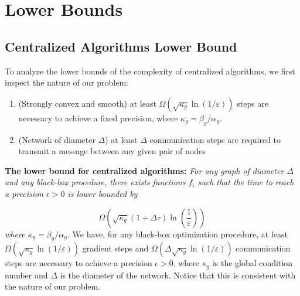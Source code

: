 \documentclass[12pt]{article}
\begin{document}
\section{Lower Bounds}
\subsection{Centralized Algorithms Lower Bound}
To analyze the lower bounds of the complexity of centralized algorithms, we first inspect the nature of our problem: 
\begin{enumerate}
    \item (Strongly convex and smooth) at least $\Omega\left(\sqrt{\kappa_{g}} \ln (1 / \varepsilon)\right)$ steps are necessary to achieve a fixed precision, where $\kappa_{g}=\beta_{g} / \alpha_{g}$. 
    \item (Network of diameter $\Delta$) at least $\Delta$ communication steps are required to
transmit a message between any given pair of nodes
\end{enumerate}
\textbf{The lower bound for centralized algorithms: }
\newline
\textit{For any graph of diameter $\Delta$ and any black-box procedure, there exists functions $f_i$ such that the time to reach a precision $\epsilon > 0$ is lower bounded by}

$$\Omega\left(\sqrt{\kappa_{g}}(1+\Delta \tau) \ln \left(\frac{1}{\varepsilon}\right)\right)$$
\textit{where $\kappa_{g}=\beta_{g} / \alpha_{g}$. }
\newline
\newline
We have, for any black-box optimization procedure, at least $\Omega\left(\sqrt{\kappa_{g}} \ln (1 / \varepsilon)\right)$ gradient steps and $\Omega\left(\Delta\sqrt{\kappa_{g}} \ln (1 / \varepsilon)\right)$ communication steps are necessary to achieve a precision $\epsilon > 0$,
where $\kappa_{g}$ is the global condition number and $\Delta$ is the diameter of the network. 
\newline
Notice that this is consistent with the nature of our problem. 
\end{document}
